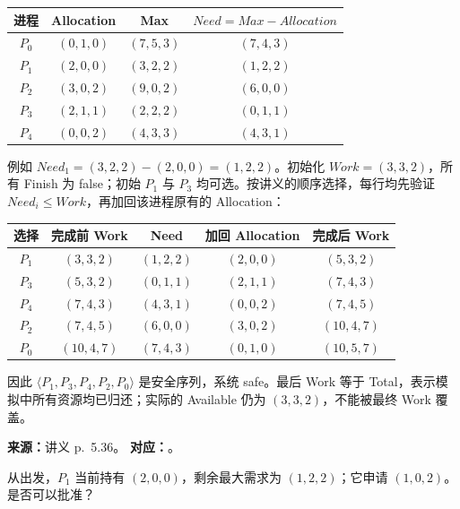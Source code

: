 \begin{center}
\begin{tabular}{@{}cccc@{}}
  \toprule
  进程 & Allocation & Max & $Need=Max-Allocation$ \\
  \midrule
  $P_0$ & $(0,1,0)$ & $(7,5,3)$ & $(7,4,3)$ \\
  $P_1$ & $(2,0,0)$ & $(3,2,2)$ & $(1,2,2)$ \\
  $P_2$ & $(3,0,2)$ & $(9,0,2)$ & $(6,0,0)$ \\
  $P_3$ & $(2,1,1)$ & $(2,2,2)$ & $(0,1,1)$ \\
  $P_4$ & $(0,0,2)$ & $(4,3,3)$ & $(4,3,1)$ \\
  \bottomrule
\end{tabular}
\end{center}

\begin{checkedsolution}
例如 $Need_1=(3,2,2)-(2,0,0)=(1,2,2)$。初始化 $Work=(3,3,2)$，所有 Finish 为 false；初始 $P_1$ 与 $P_3$ 均可选。按讲义的顺序选择，每行均先验证 $Need_i\le Work$，再加回该进程原有的 Allocation：
\begin{center}
\begin{tabular}{@{}ccccc@{}}
  \toprule
  选择 & 完成前 Work & Need & 加回 Allocation & 完成后 Work \\
  \midrule
  $P_1$ & $(3,3,2)$ & $(1,2,2)$ & $(2,0,0)$ & $(5,3,2)$ \\
  $P_3$ & $(5,3,2)$ & $(0,1,1)$ & $(2,1,1)$ & $(7,4,3)$ \\
  $P_4$ & $(7,4,3)$ & $(4,3,1)$ & $(0,0,2)$ & $(7,4,5)$ \\
  $P_2$ & $(7,4,5)$ & $(6,0,0)$ & $(3,0,2)$ & $(10,4,7)$ \\
  $P_0$ & $(10,4,7)$ & $(7,4,3)$ & $(0,1,0)$ & $(10,5,7)$ \\
  \bottomrule
\end{tabular}
\end{center}
因此 $\langle P_1,P_3,P_4,P_2,P_0\rangle$ 是安全序列，系统 safe。最后 Work 等于 Total，表示模拟中所有资源均已归还；实际的 Available 仍为 $(3,3,2)$，不能被最终 Work 覆盖。
\end{checkedsolution}


\textbf{来源：}讲义 p.~5.36。\quad
\textbf{对应：}。

从出发，$P_1$ 当前持有 $(2,0,0)$，剩余最大需求为 $(1,2,2)$；它申请 $(1,0,2)$。是否可以批准？

